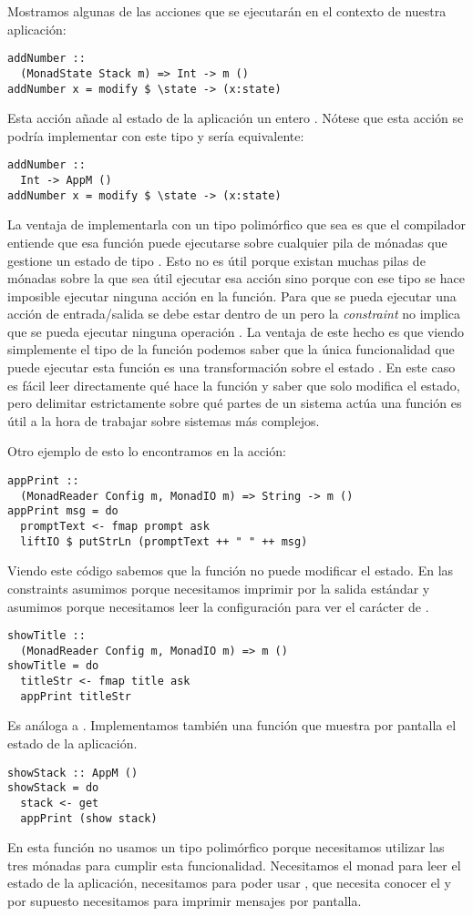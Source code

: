 Mostramos algunas de las acciones que se ejecutarán en el contexto
de nuestra aplicación:
\begin{verbatim}
addNumber ::
  (MonadState Stack m) => Int -> m ()
addNumber x = modify $ \state -> (x:state)
\end{verbatim}
Esta acción añade al estado de la aplicación un entero . Nótese
que esta acción se podría implementar con este tipo y sería equivalente:
\begin{verbatim}
addNumber ::
  Int -> AppM ()
addNumber x = modify $ \state -> (x:state)
\end{verbatim}
La ventaja de implementarla con un tipo polimórfico que sea
 es que el compilador entiende que esa función
puede ejecutarse sobre cualquier pila de mónadas que gestione un estado
de tipo . Esto no es útil porque existan muchas pilas de
mónadas sobre la que sea útil ejecutar esa acción sino porque con
ese tipo se hace imposible ejecutar ninguna acción  en
la función. Para que se pueda ejecutar una acción de entrada/salida
se debe estar dentro de un  pero la \textit{constraint}
 no implica que se pueda ejecutar ninguna
operación . La ventaja de este hecho es que viendo
simplemente el tipo
de la función podemos saber que la única funcionalidad que puede
ejecutar esta función es una transformación sobre el estado
. En este caso es fácil leer directamente qué hace la función
y saber que solo modifica el estado, pero delimitar estrictamente
sobre qué partes de un sistema actúa una función es útil a la hora
de trabajar sobre sistemas más complejos.

Otro ejemplo de esto lo encontramos en la acción:
\begin{verbatim}
appPrint ::
  (MonadReader Config m, MonadIO m) => String -> m ()
appPrint msg = do
  promptText <- fmap prompt ask
  liftIO $ putStrLn (promptText ++ " " ++ msg)
\end{verbatim}
Viendo este código sabemos que la función  no puede
modificar el estado. En las constraints asumimos 
porque necesitamos imprimir por la salida estándar y asumimos
 porque necesitamos leer la configuración
para ver el carácter de .

\begin{verbatim}
showTitle ::
  (MonadReader Config m, MonadIO m) => m ()
showTitle = do
  titleStr <- fmap title ask
  appPrint titleStr
\end{verbatim}
Es análoga a . Implementamos también una función
que muestra por pantalla el estado de la aplicación.
\begin{verbatim}
showStack :: AppM ()
showStack = do
  stack <- get
  appPrint (show stack)
\end{verbatim}
En esta función no usamos un tipo polimórfico porque necesitamos
utilizar las tres mónadas para cumplir esta funcionalidad. Necesitamos
el  monad para leer el estado de la aplicación, necesitamos
 para poder usar , que necesita conocer
el  y por supuesto necesitamos  para imprimir
mensajes por pantalla.

